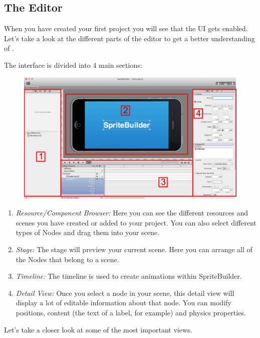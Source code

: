 \subsection{The Editor}
When you have created your first \SB{} project you will see that the \SB{} UI
gets enabled. Let's take a look at the different parts of the editor to get a
better understanding of \SB{}.

The \SB{} interface is divided into 4 main sections:
\begin{figure}[H]
		\centering
		\includegraphics[width=0.9\linewidth]{images/spritebuilder/spritebuilder_ui.png}     
\end{figure} 
\begin{enumerate}
  \item \textit{Resource/Component Browser:} Here you can see the different
  resources and scenes you have created or added to your project. You can also select different types of Nodes and drag them into your scene.
  \item \textit{Stage:} The stage will preview your current scene. Here you can
  arrange all of the Nodes that belong to a scene. 
  \item \textit{Timeline:} The timeline is used to create animations within
  SpriteBuilder.
  \item \textit{Detail View:} Once you select a node in your scene, this detail
  view will display a lot of editable information about that node. You can modify positions, content (the text of a label, for example) and physics properties.
\end{enumerate}
Let's take a closer look at some of the most important views.


